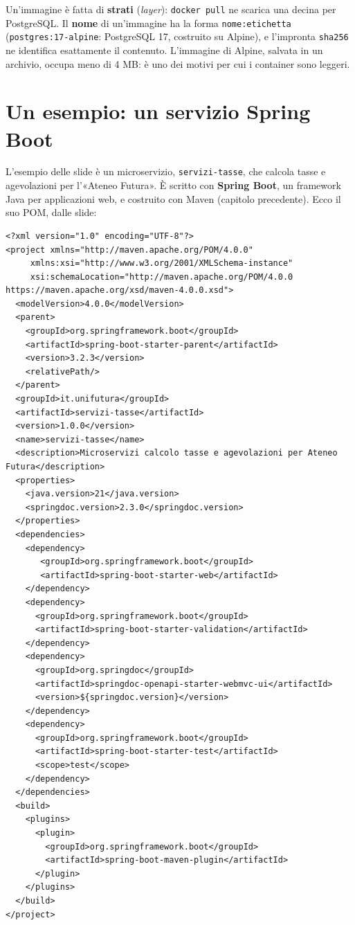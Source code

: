 Un'immagine è fatta di \textbf{strati} (\textit{layer}): \texttt{docker pull} ne scarica una decina per PostgreSQL. Il
\textbf{nome} di un'immagine ha la forma \texttt{nome:etichetta} (\texttt{postgres:17-alpine}: PostgreSQL 17, costruito
su Alpine), e l'impronta \texttt{sha256} ne identifica esattamente il contenuto. L'immagine di Alpine, salvata in un
archivio, occupa meno di 4 MB: è uno dei motivi per cui i container sono leggeri.

\section{Un esempio: un servizio Spring Boot}

L'esempio delle slide è un microservizio, \texttt{servizi-tasse}, che calcola tasse e agevolazioni per l'«Ateneo
Futura». È scritto con \textbf{Spring Boot}, un framework Java per applicazioni web, e costruito con Maven (capitolo
precedente). Ecco il suo POM, dalle slide:

\begin{lstlisting}[style=xml, name=servizi-tasse/pom.xml]
<?xml version="1.0" encoding="UTF-8"?>
<project xmlns="http://maven.apache.org/POM/4.0.0"
     xmlns:xsi="http://www.w3.org/2001/XMLSchema-instance"
     xsi:schemaLocation="http://maven.apache.org/POM/4.0.0
https://maven.apache.org/xsd/maven-4.0.0.xsd">
  <modelVersion>4.0.0</modelVersion>
  <parent>
    <groupId>org.springframework.boot</groupId>
    <artifactId>spring-boot-starter-parent</artifactId>
    <version>3.2.3</version>
    <relativePath/>
  </parent>
  <groupId>it.unifutura</groupId>
  <artifactId>servizi-tasse</artifactId>
  <version>1.0.0</version>
  <name>servizi-tasse</name>
  <description>Microservizi calcolo tasse e agevolazioni per Ateneo
Futura</description>
  <properties>
    <java.version>21</java.version>
    <springdoc.version>2.3.0</springdoc.version>
  </properties>
  <dependencies>
    <dependency>
       <groupId>org.springframework.boot</groupId>
       <artifactId>spring-boot-starter-web</artifactId>
    </dependency>
    <dependency>
      <groupId>org.springframework.boot</groupId>
      <artifactId>spring-boot-starter-validation</artifactId>
    </dependency>
    <dependency>
      <groupId>org.springdoc</groupId>
      <artifactId>springdoc-openapi-starter-webmvc-ui</artifactId>
      <version>${springdoc.version}</version>
    </dependency>
    <dependency>
      <groupId>org.springframework.boot</groupId>
      <artifactId>spring-boot-starter-test</artifactId>
      <scope>test</scope>
    </dependency>
  </dependencies>
  <build>
    <plugins>
      <plugin>
        <groupId>org.springframework.boot</groupId>
        <artifactId>spring-boot-maven-plugin</artifactId>
      </plugin>
    </plugins>
  </build>
</project>
\end{lstlisting}

